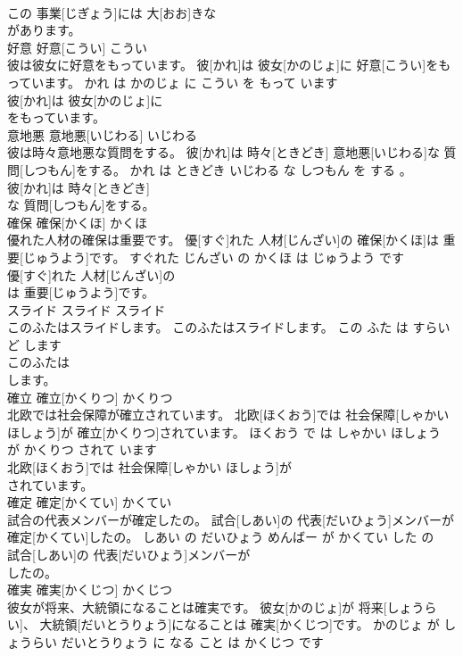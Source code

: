 \documentclass[8pt]{extreport}
\begin{document}
\begin{CJK}{UTF8}{min}
\\	この 事業[じぎょう]には 大[おお]きな
\\	があります。			
\\	好意	好意[こうい]	こうい	
\\	彼は彼女に好意をもっています。	彼[かれ]は 彼女[かのじょ]に 好意[こうい]をもっています。	かれ は かのじょ に こうい を もって います	
\\	彼[かれ]は 彼女[かのじょ]に
\\	をもっています。			
\\	意地悪	意地悪[いじわる]	いじわる	
\\	彼は時々意地悪な質問をする。	彼[かれ]は 時々[ときどき] 意地悪[いじわる]な 質問[しつもん]をする。	かれ は ときどき いじわる な しつもん を する 。	
\\	彼[かれ]は 時々[ときどき]
\\	な 質問[しつもん]をする。			
\\	確保	確保[かくほ]	かくほ	
\\	優れた人材の確保は重要です。	優[すぐ]れた 人材[じんざい]の 確保[かくほ]は 重要[じゅうよう]です。	すぐれた じんざい の かくほ は じゅうよう です	
\\	優[すぐ]れた 人材[じんざい]の
\\	は 重要[じゅうよう]です。			
\\	スライド	スライド	スライド	
\\	このふたはスライドします。	このふたはスライドします。	この ふた は すらいど します	
\\	このふたは
\\	します。			
\\	確立	確立[かくりつ]	かくりつ	
\\	北欧では社会保障が確立されています。	北欧[ほくおう]では 社会保障[しゃかい ほしょう]が 確立[かくりつ]されています。	ほくおう で は しゃかい ほしょう が かくりつ されて います	
\\	北欧[ほくおう]では 社会保障[しゃかい ほしょう]が
\\	されています。			
\\	確定	確定[かくてい]	かくてい	
\\	試合の代表メンバーが確定したの。	試合[しあい]の 代表[だいひょう]メンバーが 確定[かくてい]したの。	しあい の だいひょう めんばー が かくてい した の	
\\	試合[しあい]の 代表[だいひょう]メンバーが
\\	したの。			
\\	確実	確実[かくじつ]	かくじつ	
\\	彼女が将来、大統領になることは確実です。	彼女[かのじょ]が 将来[しょうらい]、 大統領[だいとうりょう]になることは 確実[かくじつ]です。	かのじょ が しょうらい だいとうりょう に なる こと は かくじつ です	

\end{CJK}
\end{document}
